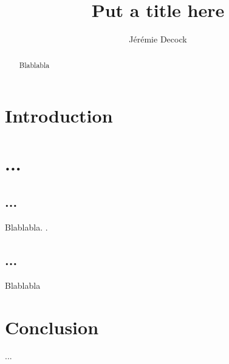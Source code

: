 \documentclass{article}
\title{Put a title here}
\author{J\'er\'emie Decock}
\begin{document}
\maketitle

\begin{abstract}
  Blablabla
\end{abstract}


\section{Introduction}\label{sec:intro}


\section{...}\label{sec:sect1}


\subsection{...}\label{subsec:sect11}

Blablabla.
\cite{decock:hal-00755663}.


\subsection{...}\label{subsec:sect12}

Blablabla


\section{Conclusion}\label{sec:ccl}
 
...



\end{document}
